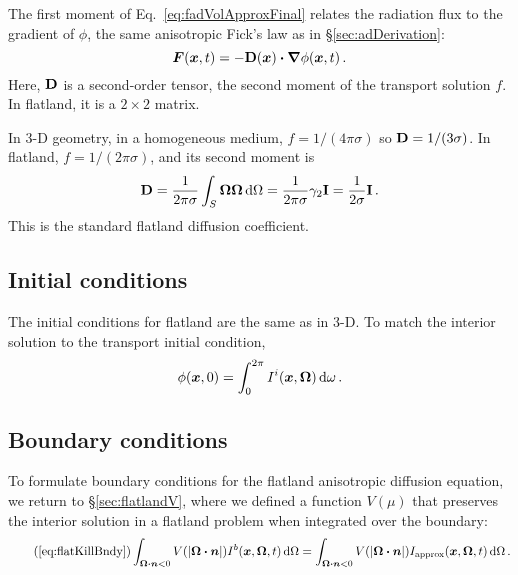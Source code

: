 The first moment of Eq.~\eqref{eq:fadVolApproxFinal} relates the radiation flux
to the gradient of $\phi$, the same anisotropic Fick's law as in
\S\ref{sec:adDerivation}:
\begin{equation}\label{eq:adFicks_6}
  \bm{F}(\bm{x},t) = - \mathbf{D}(\bm{x}) \bm{\cdot} \bm{\nabla} \phi(\bm{x},t) \,.
\end{equation}
Here, $\mathbf{D}$ is a
second-order tensor, the second moment of the transport solution $f$. In
flatland, it is a $2\times 2$ matrix.

In 3-D
geometry, in a homogeneous medium, $f=1/(4\pi\sigma)$ so $\mathbf{D} = 1/(3\sigma)$.
In flatland, $f = 1/(2\pi\sigma)$, and its second moment is
\begin{equation*}
  \mathbf{D} = \frac{1}{2\pi\sigma} \int_{S}\bm{\Omega}\bm{\Omega}  \mathop{}\!\mathrm{d}\Omega
  = \frac{1}{2\pi\sigma} \gamma_2 \mathbf{I}
  = \frac{1}{2\sigma} \mathbf{I} \,.
\end{equation*}
This is the standard flatland diffusion coefficient.

\subsection{Initial conditions}
The initial conditions for flatland are the same as in 3-D. To match the
interior solution to the transport initial condition,
\begin{equation*}
  \phi(\bm{x},0) = \int_{0}^{2\pi} I^i(\bm{x},\bm{\Omega}) \mathop{}\!\mathrm{d}\omega\,.
\end{equation*}

\subsection{Boundary conditions}

To formulate boundary conditions for the flatland anisotropic diffusion
equation, we return to \S\ref{sec:flatlandV}, where we defined a
function $V(\mu)$ that preserves the interior solution in a flatland problem
when integrated over the boundary:
\begin{equation}\tag{\ref{eq:flatKillBndy}}
\int_{\vec{\Omega}\vd\vec{n} < 0} V( \abs{\vec{\Omega}\vd\vec{n}})
I^b(\vec{x}, \vec{\Omega},t) \ud\Omega
=
\int_{\vec{\Omega}\vd\vec{n} < 0} V( \abs{\vec{\Omega}\vd\vec{n}})
I_\text{approx}(\vec{x}, \vec{\Omega},t) \ud\Omega \,.
\end{equation}

